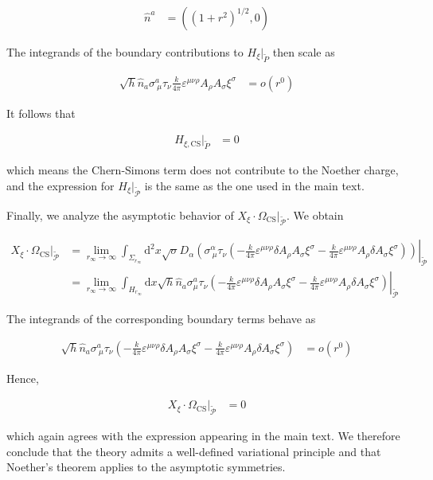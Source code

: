 \begin{align}
\hat{n}^{a} & =((1+r^{2})^{1/2},0)
\end{align}

The integrands of the boundary contributions to $H_{\xi}|_{\widetilde{P}}$ then scale as

\begin{align}
\sqrt{ h }\hat{n}_{a}\sigma ^{a}_{~\mu}\tau _{\nu}\frac{k}{4\pi}\varepsilon ^{\mu \nu \rho}A_{\rho}A_{\sigma}\xi ^{\sigma} & =o(r^{0})
\end{align}

It follows that

\begin{align}
H_{\xi,\mathrm{CS}}|_{\widetilde{P}} & =0
\end{align}

which means the Chern-Simons term does not contribute to the Noether charge, and the expression for $H_{\xi}|_{\widetilde{\mathcal{P}}}$ is the same as the one used in the main text.

Finally, we analyze the asymptotic behavior of $X_{\xi}\cdot \Omega _{\mathrm{CS}}|_{\widetilde{\mathcal{P}}}$. We obtain

\begin{align}
X_{\xi}\cdot \Omega _{\mathrm{CS}}|_{\widetilde{\mathcal{P}}} & =\lim_{ r_{\infty} \to \infty }\left.\int _{\Sigma _{r_{\infty}}}\mathrm{d}^{2}x\sqrt{ \sigma }D_{\alpha}\left(\sigma ^{\alpha}_{~\mu}\tau _{\nu}\left(-\frac{k}{4\pi}\varepsilon ^{\mu \nu \rho}\delta A_{\rho}A_{\sigma}\xi ^{\sigma}-\frac{k}{4\pi}\varepsilon ^{\mu \nu \rho}A_{\rho}\delta A_{\sigma}\xi ^{\sigma}\right)\right)\right|_{\widetilde{\mathcal{P}}} \\
 & =\lim_{ r_{\infty} \to \infty }\left.\int _{H_{r_{\infty}}}\mathrm{d}x\sqrt{ h }\hat{n}_{a}\sigma ^{a}_{\mu}\tau _{\nu}\left(-\frac{k}{4\pi}\varepsilon ^{\mu \nu \rho}\delta A_{\rho}A_{\sigma}\xi ^{\sigma}-\frac{k}{4\pi}\varepsilon ^{\mu \nu \rho}A_{\rho}\delta A_{\sigma}\xi ^{\sigma}\right)\right|_{\widetilde{\mathcal{P}}}
\end{align}

The integrands of the corresponding boundary terms behave as

\begin{align}
\sqrt{ h }\hat{n}_{a}\sigma ^{a}_{~\mu}\tau _{\nu}\left( -\frac{k}{4\pi}\varepsilon ^{\mu \nu \rho}\delta A_{\rho}A_{\sigma}\xi ^{\sigma}-\frac{k}{4\pi}\varepsilon ^{\mu \nu \rho}A_{\rho}\delta A_{\sigma}\xi ^{\sigma} \right) & =o(r^{0})
\end{align}

Hence,

\begin{align}
X_{\xi}\cdot \Omega _{\mathrm{CS}}|_{\widetilde{\mathcal{P}}} & =0
\end{align}

which again agrees with the expression appearing in the main text. We therefore conclude that the theory admits a well-defined variational principle and that Noether's theorem applies to the asymptotic symmetries.
